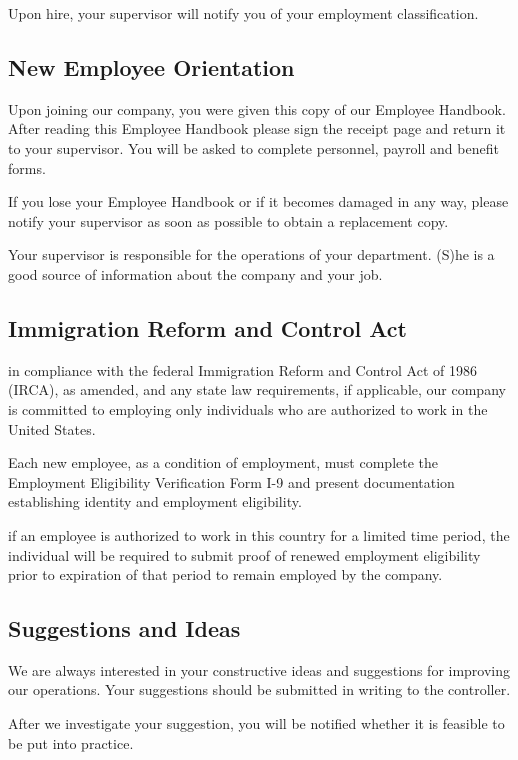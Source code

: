 Upon hire, your supervisor will notify you of your employment classification.

\subsection{New Employee Orientation}

Upon joining our company, you were given this copy of our Employee Handbook. After reading this Employee Handbook please sign the receipt page and return it to your supervisor. You will be asked to complete personnel, payroll and benefit forms.

If you lose your Employee Handbook or if it becomes damaged in any way, please notify your supervisor as soon as possible to obtain a replacement copy.

Your supervisor is responsible for the operations of your department. (S)he is a good source of information about the company and your job.

\subsection{Immigration Reform and Control Act}

in compliance with the federal Immigration Reform and Control Act of 1986 (IRCA), as amended, and any state law requirements, if applicable, our company is committed to employing only individuals who are authorized to work in the United States.

Each new employee, as a condition of employment, must complete the Employment Eligibility Verification Form I-9 and present documentation establishing identity and employment eligibility. 

if an employee is authorized to work in this country for a limited time period, the individual will be required to submit proof of renewed employment eligibility prior to expiration of that period to remain employed by the company.

\subsection{Suggestions and Ideas}

We are always interested in your constructive ideas and suggestions for improving our operations. Your suggestions should be submitted in writing to the controller.

After we investigate your suggestion, you will be notified whether it is feasible to be put into practice.

